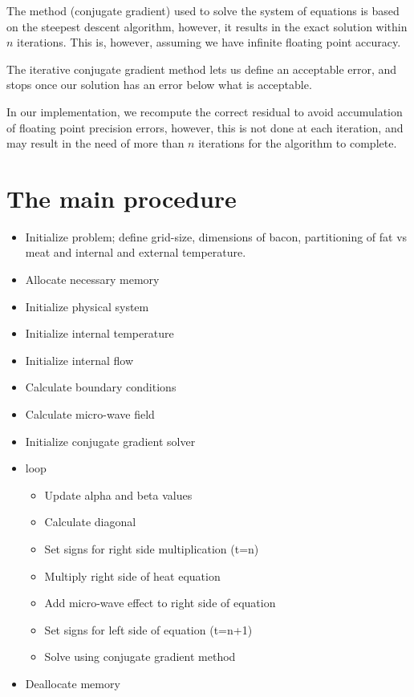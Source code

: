 The method (conjugate gradient) used to solve the system of equations is based on 
the steepest descent algorithm, however, it results in the exact solution within
$n$ iterations. This is, however, assuming we have infinite floating point accuracy.

The iterative conjugate gradient method lets us define an acceptable error, and stops
once our solution has an error below what is acceptable.

In our implementation, we recompute the correct residual to avoid accumulation of
floating point precision errors, however, this is not done at each iteration, and may
result in the need of more than $n$ iterations for the algorithm to complete.

\section{The main procedure}

\begin{itemize}

  \item Initialize problem; define grid-size, dimensions of bacon, partitioning of fat vs meat
  and internal and external temperature.
  \item Allocate necessary memory
  \item Initialize physical system
  \item Initialize internal temperature
  \item Initialize internal flow
  \item Calculate boundary conditions
  \item Calculate micro-wave field
  \item Initialize conjugate gradient solver
  \item loop
  \begin{itemize}
    \item Update alpha and beta values
    \item Calculate diagonal
    \item Set signs for right side multiplication (t=n)
    \item Multiply right side of heat equation
    \item Add micro-wave effect to right side of equation
    \item Set signs for left side of equation (t=n+1)
    \item Solve using conjugate gradient method
  \end{itemize}

\item Deallocate memory
\end{itemize}

